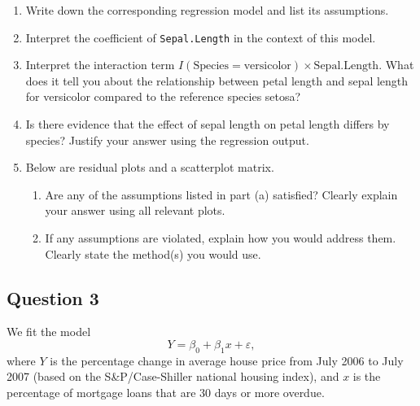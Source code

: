 \begin{enumerate}
\item[(a)] Write down the corresponding regression model and list its assumptions.

\vspace{4cm}

\item[(b)] Interpret the coefficient of \texttt{Sepal.Length} in the context of this model.

\vspace{4cm}

\item[(c)] Interpret the interaction term $I(\text{Species}=\text{versicolor}) \times \text{Sepal.Length}$. What does it tell you about the relationship between petal length and sepal length for versicolor compared to the reference species setosa?

\vspace{4cm}

\item[(d)] Is there evidence that the effect of sepal length on petal length differs by species? Justify your answer using the regression output.

\vspace{4cm}

\item[(e)] Below are residual plots and a scatterplot matrix.

\begin{enumerate}
\item[(i)] Are any of the assumptions listed in part (a) satisfied? Clearly explain your answer using all relevant plots.

\vspace{4cm}

\item[(ii)] If any assumptions are violated, explain how you would address them. Clearly state the method(s) you would use.

\vspace{4cm}
\end{enumerate}
\end{enumerate}

\newpage

\subsection{Question 3}

We fit the model
\[
Y = \beta_0 + \beta_1 x + \varepsilon,
\]
where $Y$ is the percentage change in average house price from July 2006 to July 2007 (based on the S\&P/Case-Shiller national housing index), and $x$ is the percentage of mortgage loans that are 30 days or more overdue.

